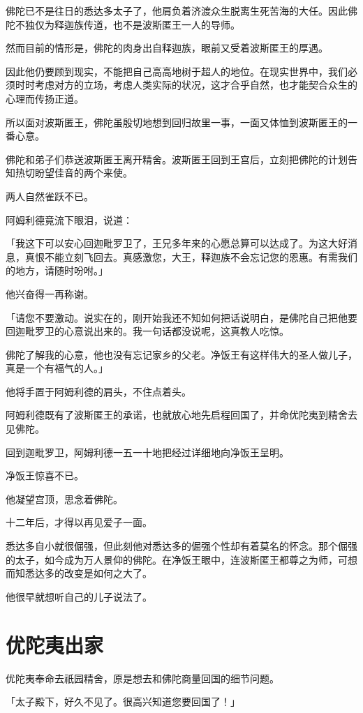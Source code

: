 \documentclass[twoside,openany]{book}
\begin{document}
佛陀已不是往日的悉达多太子了，他肩负着济渡众生脱离生死苦海的大任。因此佛陀不独仅为释迦族传道，也不是波斯匿王一人的导师。

然而目前的情形是，佛陀的肉身出自释迦族，眼前又受着波斯匿王的厚遇。

因此他仍要顾到现实，不能把自己高高地树于超人的地位。在现实世界中，我们必须时时考虑对方的立场，考虑人类实际的状况，这才合乎自然，也才能契合众生的心理而传扬正道。

所以面对波斯匿王，佛陀虽殷切地想到回归故里一事，一面又体恤到波斯匿王的一番心意。

佛陀和弟子们恭送波斯匿王离开精舍。波斯匿王回到王宫后，立刻把佛陀的计划告知热切盼望佳音的两个来使。

两人自然雀跃不已。

阿姆利德竟流下眼泪，说道：

「我这下可以安心回迦毗罗卫了，王兄多年来的心愿总算可以达成了。为这大好消息，真恨不能立刻飞回去。真感激您，大王，释迦族不会忘记您的恩惠。有需我们的地方，请随时吩咐。」

他兴奋得一再称谢。

「请您不要激动。说实在的，刚开始我还不知如何把话说明白，是佛陀自己把他要回迦毗罗卫的心意说出来的。我一句话都没说呢，这真教人吃惊。

佛陀了解我的心意，他也没有忘记家乡的父老。净饭王有这样伟大的圣人做儿子，真是一个有福气的人。」

他将手置于阿姆利德的肩头，不住点着头。

阿姆利德既有了波斯匿王的承诺，也就放心地先启程回国了，并命优陀夷到精舍去见佛陀。

回到迦毗罗卫，阿姆利德一五一十地把经过详细地向净饭王呈明。

净饭王惊喜不已。

他凝望宫顶，思念着佛陀。

十二年后，才得以再见爱子一面。

悉达多自小就很倔强，但此刻他对悉达多的倔强个性却有着莫名的怀念。那个倔强的太子，如今成为万人景仰的佛陀。在净饭王眼中，连波斯匿王都尊之为师，可想而知悉达多的改变是如何之大了。

他很早就想听自己的儿子说法了。

\section{优陀夷出家}\label{sec7.4}

优陀夷奉命去祇园精舍，原是想去和佛陀商量回国的细节问题。

「太子殿下，好久不见了。很高兴知道您要回国了！」
\end{document}

